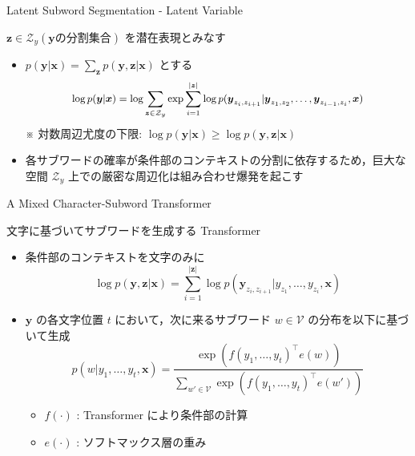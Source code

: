 \documentclass[unicode, 12pt, aspectratio=43]{beamer}
\begin{document}
\begin{frame}[label={sec:org68c6bda}]{\normalsize Latent Subword Segmentation - Latent Variable}
\begin{block}{\(\boldsymbol{z} \in \mathcal{Z}_{y} (\boldsymbol{y} \text{の分割集合})\) を潜在表現とみなす}
\begin{itemize}
\item \(p(\boldsymbol{y} | \boldsymbol{x}) = \sum_{\boldsymbol{z}} p(\boldsymbol{y}, \boldsymbol{z} | \boldsymbol{x})\) とする
\begin{equation*}
  \small \log p(\boldsymbol{y} | \boldsymbol{x}) = \log\sum_{\boldsymbol{z}\in\mathcal{Z}_y}\exp\sum_{i=1}^{|\boldsymbol{z}|} \log p(\boldsymbol{y}_{z_i, z_{i+1}} | \boldsymbol{y}_{z_1, z_2},\ldots,\boldsymbol{y}_{z_{i-1}, z_i}, \boldsymbol{x})
\end{equation*}
※ 対数周辺尤度の下限: \(\log p(\boldsymbol{y} | \boldsymbol{x}) \ge \log p(\boldsymbol{y}, \boldsymbol{z} | \boldsymbol{x})\)

\item 各サブワードの確率が条件部のコンテキストの分割に依存するため，巨大な空間 \(\mathcal{Z}_y\) 上での厳密な周辺化は組み合わせ爆発を起こす
\end{itemize}
\end{block}
\end{frame}

\begin{frame}[label={sec:org0f3add6}]{A Mixed Character-Subword Transformer}
\begin{block}{文字に基づいてサブワードを生成する Transformer}
\begin{itemize}
\item 条件部のコンテキストを文字のみに
\begin{equation*}
  \log p(\boldsymbol{y}, \boldsymbol{z} | \boldsymbol{x}) = \sum_{i=1}^{|\boldsymbol{z}|} \log p(\boldsymbol{y}_{z_i, z_{i+1}} | y_{z_1}, \ldots, y_{z_i}, \boldsymbol{x})
\end{equation*}

\item \(\boldsymbol{y}\) の各文字位置 \(t\) において，次に来るサブワード \(w \in \mathcal{V}\) の分布を以下に基づいて生成
\begin{equation*}
  p(w | y_{1}, \ldots, y_{t}, \boldsymbol{x}) = \frac{\exp(f(y_1,\ldots,y_t)^\top e(w))}{\sum_{w' \in \mathcal{V}}\exp(f(y_1,\ldots,y_t)^\top e(w'))}
\end{equation*}
\begin{itemize}
\item \vspace{-0.5cm} \(f(\cdot)\) : Transformer により条件部の計算
\item \(e(\cdot)\) : ソフトマックス層の重み
\end{itemize}
\end{itemize}
\end{block}
\end{frame}
\end{document}
